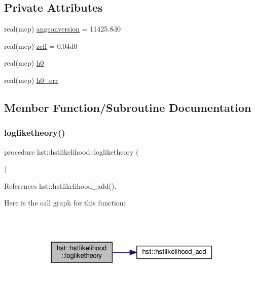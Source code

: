 \subsection*{Private Attributes}
\begin{DoxyCompactItemize}
\item 
real(mcp) \mbox{\hyperlink{structhst_1_1hstlikelihood_a4b9eb66ab466bc29f557e6a999ae748a}{angconversion}} = 11425.\+8d0
\item 
real(mcp) \mbox{\hyperlink{structhst_1_1hstlikelihood_a8413706538afa2f49e608f5fa420ee71}{zeff}} = 0.\+04d0
\item 
real(mcp) \mbox{\hyperlink{structhst_1_1hstlikelihood_ab27f87c3fdf1869ec516250fce973028}{h0}}
\item 
real(mcp) \mbox{\hyperlink{structhst_1_1hstlikelihood_aa3e5dd3495b7563cfe4ebd0bf45631fa}{h0\+\_\+err}}
\end{DoxyCompactItemize}


\subsection{Member Function/\+Subroutine Documentation}
\mbox{\label{structhst_1_1hstlikelihood_ae3ffa536a09d701efd3f2b5070455a57}} 
\subsubsection{\texorpdfstring{logliketheory()}{logliketheory()}}
{\footnotesize\ttfamily procedure hst\+::hstlikelihood\+::logliketheory (\begin{DoxyParamCaption}{ }\end{DoxyParamCaption})\hspace{0.3cm}{\ttfamily [private]}}



References hst\+::hstlikelihood\+\_\+add().

Here is the call graph for this function\+:
\nopagebreak
\begin{figure}[H]
\begin{center}
\leavevmode
\includegraphics[width=318pt]{structhst_1_1hstlikelihood_ae3ffa536a09d701efd3f2b5070455a57_cgraph}
\end{center}
\end{figure}


